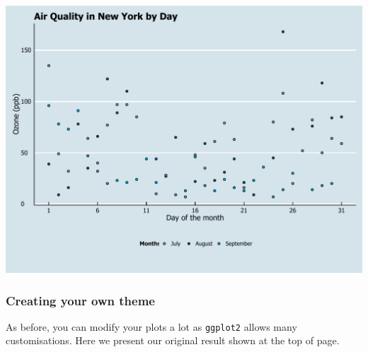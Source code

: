 \documentclass[]{article}
\begin{document}
\begin{center}\includegraphics{0_all_posts_pdf/scatter_14-1} \end{center}

\subsubsection{Creating your own theme}\label{creating-your-own-theme-4}

As before, you can modify your plots a lot as \texttt{ggplot2} allows
many customisations. Here we present our original result shown at the
top of page.
\end{document}
